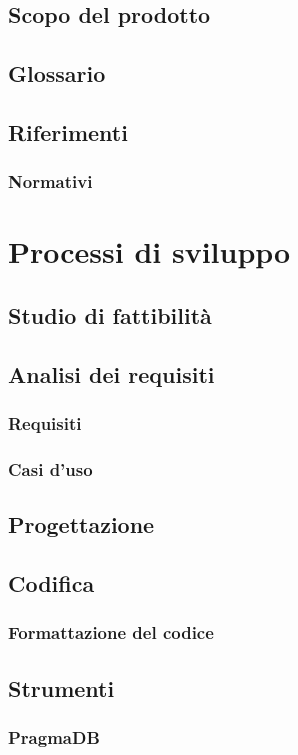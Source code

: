 \subsection{Scopo del prodotto}

	\subsection{Glossario}
	\subsection{Riferimenti}
		\subsubsection{Normativi}
\section{Processi di sviluppo}
	\subsection{Studio di fattibilità}
	\subsection{Analisi dei requisiti}
		\subsubsection{Requisiti}
		\subsubsection{Casi d'uso}
	\subsection{Progettazione}
	\subsection{Codifica}
		\subsubsection{Formattazione del codice}
	\subsection{Strumenti}
		\subsubsection{PragmaDB}
